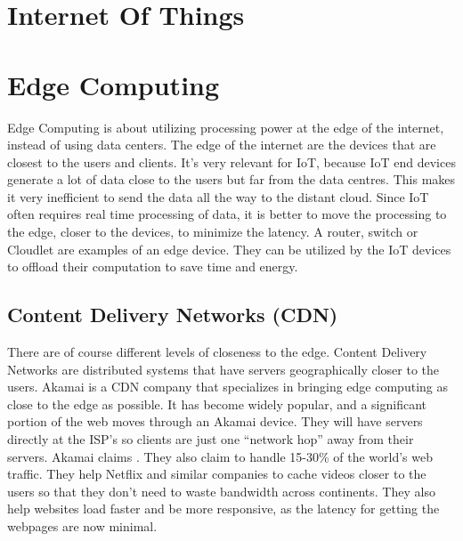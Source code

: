 








\section{Internet Of Things}


\section{Edge Computing}
Edge Computing is about utilizing processing power at the edge of the internet, instead of using data centers. The edge of the internet are the devices that are closest to the users and clients. It's very relevant for IoT, because IoT end devices generate a lot of data close to the users but far from the data centres. This makes it very inefficient to send the data all the way to the distant cloud. Since IoT often requires real time processing of data, it is better to move the processing to the edge, closer to the devices, to minimize the latency\cite{shi_edge_2016}.
A router, switch or Cloudlet are examples of an edge device. They can be utilized by the IoT devices to offload their computation to save time and energy.


\subsection{Content Delivery Networks (CDN)}
There are of course different levels of closeness to the edge. Content Delivery Networks are distributed systems that have servers geographically closer to the users. Akamai is a CDN company that specializes in bringing edge computing as close to the edge as possible. It has become widely popular, and a significant portion of the web moves through an Akamai device. They will have servers directly at the ISP’s so clients are just one “network hop” away from their servers. Akamai\cite{noauthor_exceptional_nodate} claims . They also claim to handle 15-30\% of the world's web traffic. They help Netflix and similar companies to cache videos closer to the users so that they don't need to waste bandwidth across continents. They also help websites load faster and be more responsive, as the latency for getting the webpages are now minimal.


